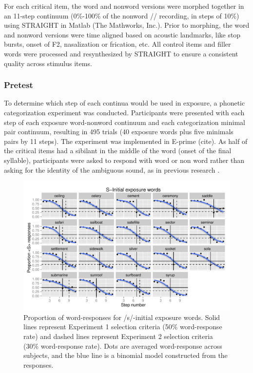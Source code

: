 For each critical item, the word and nonword versions were morphed together in an 11-step continuum (0\%-100\% of the nonword /\textesh/ recording, in steps of 10\%) using STRAIGHT \citep{Kawahara2008} in Matlab (The Mathworks, Inc.).  
Prior to morphing, the word and nonword versions were time aligned based on acoustic landmarks, like stop bursts, onset of F2, nasalization or frication, etc.  
All control items and filler words were processed and resynthesized by STRAIGHT to ensure a consistent quality across stimulus items.

\subsubsection{Pretest}

To determine which step of each continua would be used in exposure, a phonetic categorization experiment was conducted.  
Participants were presented with each step of each exposure word-nonword continuum and each categorization minimal pair continuum, resulting in 495 trials (40 exposure words plus five minimals pairs by 11 steps).  
The experiment was implemented in E-prime (cite).  
As half of the critical items had a sibilant in the middle of the word (onset of the final syllable), participants were asked to respond with word or non word rather than asking for the identity of the ambiguous sound, as in previous research \citep{Reinisch2013}.  

\begin{figure}
\includegraphics[width=\textwidth]{sinitialpretest.pdf}
\caption{Proportion of word-responses for /s/-initial exposure words. Solid lines represent Experiment 1 selection criteria (50\% word-response rate) and dashed lines represent Experiment 2 selection criteria (30\% word-response rate).  Dots are averaged word-response across subjects, and the blue line is a binomial model constructed from the responses.}
\end{figure}

